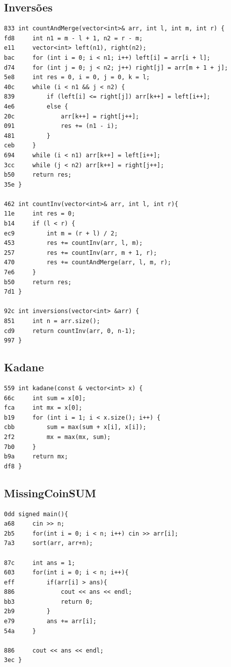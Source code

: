 \documentclass[11pt, a4paper, twoside]{article}
\begin{document}
\subsection{Inversões}
\begin{lstlisting}
833 int countAndMerge(vector<int>& arr, int l, int m, int r) {
fd8     int n1 = m - l + 1, n2 = r - m;
e11     vector<int> left(n1), right(n2);
bac     for (int i = 0; i < n1; i++) left[i] = arr[i + l];
d74     for (int j = 0; j < n2; j++) right[j] = arr[m + 1 + j];
5e8     int res = 0, i = 0, j = 0, k = l;
40c     while (i < n1 && j < n2) {
839         if (left[i] <= right[j]) arr[k++] = left[i++];
4e6         else {
20c             arr[k++] = right[j++];
091             res += (n1 - i);
481         }
ceb     }
694     while (i < n1) arr[k++] = left[i++];
3cc     while (j < n2) arr[k++] = right[j++];
b50     return res;
35e }

462 int countInv(vector<int>& arr, int l, int r){
11e     int res = 0;
b14     if (l < r) {
ec9         int m = (r + l) / 2;
453         res += countInv(arr, l, m);
257         res += countInv(arr, m + 1, r);
470         res += countAndMerge(arr, l, m, r);
7e6     }
b50     return res;
7d1 }

92c int inversions(vector<int> &arr) {
851   	int n = arr.size();
cd9   	return countInv(arr, 0, n-1);
997 }
\end{lstlisting}

\subsection{Kadane}
\begin{lstlisting}
559 int kadane(const & vector<int> x) {
66c 	int sum = x[0];
fca 	int mx = x[0];
b19 	for (int i = 1; i < x.size(); i++) {
cbb 		sum = max(sum + x[i], x[i]);
2f2 		mx = max(mx, sum);
7b0 	}
b9a 	return mx;
df8 }

\end{lstlisting}

\subsection{MissingCoinSUM}
\begin{lstlisting}
0dd signed main(){
a68     cin >> n;
2b5     for(int i = 0; i < n; i++) cin >> arr[i];
7a3     sort(arr, arr+n);
        
87c     int ans = 1;
603     for(int i = 0; i < n; i++){
eff         if(arr[i] > ans){
886             cout << ans << endl;
bb3             return 0;
2b9         }
e79         ans += arr[i];
54a     }
     
886     cout << ans << endl;
3ec }
\end{lstlisting}
\end{document}
